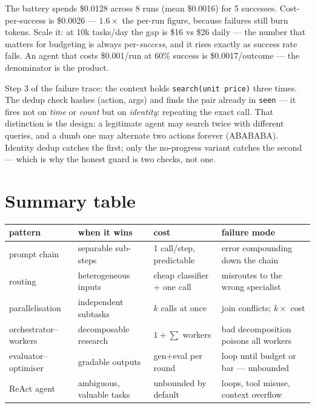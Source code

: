 \begin{example}
\label{ex:cost}
The battery spends \$0.0128 across 8 runs (mean \$0.0016) for 5
successes. Cost-per-success is \$0.0026 --- $1.6\times$ the
per-run figure, because failures still burn tokens. Scale it: at 10k
tasks/day the gap is \$16 vs \$26 daily --- the number that matters
for budgeting is always per-\emph{success}, and it rises exactly as
success rate falls. An agent that costs \$0.001/run at 60\% success
is \$0.0017/outcome --- the denominator is the product.
\end{example}
\begin{example}
\label{ex:loopdet}
Step 3 of the failure trace: the context holds
\texttt{search(unit price)} three times. The dedup check hashes
(action, args) and finds the pair already in \texttt{seen} --- it
fires not on \emph{time} or \emph{count} but on \emph{identity}:
repeating the exact call. That distinction is the design: a
legitimate agent may search twice with different queries, and a dumb
one may alternate two actions forever (ABABABA). Identity dedup
catches the first; only the no-progress variant catches the second
--- which is why the honest guard is two checks, not one.
\end{example}

\section{Summary table}
\label{sec:agentsummary}

\begin{center}\small
\begin{tabular}{p{3.0cm}p{3.2cm}p{3.0cm}p{3.0cm}}
\toprule
pattern & when it wins & cost & failure mode \\
\midrule
prompt chain & separable sub-steps & 1 call/step, predictable & error compounding down the chain \\
routing & heterogeneous inputs & cheap classifier + one call & misroutes to the wrong specialist \\
parallelisation & independent subtasks & $k$ calls at once & join conflicts; $k\times$ cost \\
orchestrator--workers & decomposable research & $1 + \sum$ workers & bad decomposition poisons all workers \\
evaluator--optimiser & gradable outputs & gen+eval per round & loop until budget or bar --- unbounded \\
ReAct agent & ambiguous, valuable tasks & unbounded by default & loops, tool misuse, context overflow \\
\bottomrule
\end{tabular}
\end{center}

